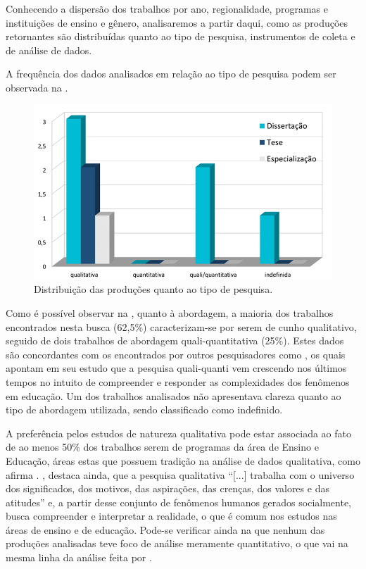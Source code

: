Conhecendo a dispersão dos trabalhos por ano, regionalidade, programas e
instituições de ensino e gênero, analisaremos a partir daqui, como as
produções retornantes são distribuídas quanto ao tipo de pesquisa,
instrumentos de coleta e de análise de dados. 

A frequência dos dados analisados em relação ao tipo de pesquisa podem
ser observada na .

\begin{figure}[!htpb]
\centering
\begin{minipage}{.75\textwidth}
\caption{Distribuição das produções quanto ao tipo de pesquisa.}\label{fig5}
\includegraphics[width=\textwidth]{Fig5.png}
\end{minipage}
\end{figure}

Como é possível observar na , quanto à abordagem, a maioria dos
trabalhos encontrados nesta busca (62,5\%) caracterizam-se por serem de
cunho qualitativo, seguido de dois trabalhos de abordagem
quali-quantitativa (25\%). Estes dados são concordantes com os
encontrados por outros pesquisadores como \textcite{minuzzi2020}, os
quais apontam em seu estudo que a pesquisa quali-quanti vem crescendo
nos últimos tempos no intuito de compreender e responder as
complexidades dos fenômenos em educação. Um dos trabalhos analisados não
apresentava clareza quanto ao tipo de abordagem utilizada, sendo
classificado como indefinido.

A preferência pelos estudos de natureza qualitativa pode estar associada
ao fato de ao menos 50\% dos trabalhos serem de programas da área de
Ensino e Educação, áreas estas que possuem tradição na análise de dados
qualitativa, como afirma \textcite{Teixeira_2015}. \textcite[p. 24]{Minayo2007}, destaca
ainda, que a pesquisa qualitativa ``[...] trabalha com o universo
dos significados, dos motivos, das aspirações, das crenças, dos valores
e das atitudes'' e, a partir desse conjunto de fenômenos humanos gerados
socialmente, busca compreender e interpretar a realidade, o que é comum
nos estudos nas áreas de ensino e de educação. Pode-se verificar ainda
na  que nenhum das produções analisadas teve foco de análise
meramente quantitativo, o que vai na mesma linha da análise feita por
\textcite{Teixeira_2015}.

